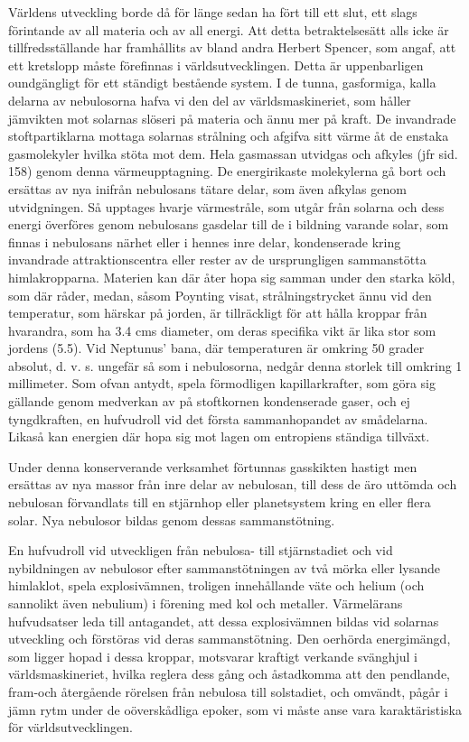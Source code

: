 \documentclass[a4paper, 12pt, oneside, swedish]{article}
\begin{document}
Världens utveckling borde då för länge sedan ha fört till ett slut, ett slags förintande av all materia och av all energi. Att detta betraktelsesätt alls icke är tillfredsställande har framhållits av bland andra Herbert Spencer, som angaf, att ett kretslopp måste förefinnas i världsutvecklingen. Detta är uppenbarligen oundgängligt för ett ständigt bestående system. I de tunna, gasformiga, kalla delarna av nebulosorna hafva vi den del av världsmaskineriet, som håller jämvikten mot solarnas slöseri på materia och ännu mer på kraft. De invandrade stoftpartiklarna mottaga solarnas strålning och afgifva sitt värme åt de enstaka gasmolekyler hvilka stöta mot dem. Hela gasmassan utvidgas och afkyles (jfr sid. 158) genom denna värmeupptagning. De energirikaste molekylerna gå bort och ersättas av nya inifrån nebulosans tätare delar, som även afkylas genom utvidgningen. Så upptages hvarje värmestråle, som utgår från solarna och dess energi överföres genom nebulosans gasdelar till de i bildning varande solar, som finnas i nebulosans närhet eller i hennes inre delar, kondenserade kring invandrade attraktionscentra eller rester av de ursprungligen sammanstötta himlakropparna. Materien kan där åter hopa sig samman under den starka köld, som där råder, medan, såsom Poynting visat, strålningstrycket ännu vid den temperatur, som härskar på jorden, är tillräckligt för att hålla kroppar från hvarandra, som ha 3.4 cms diameter, om deras specifika vikt är lika stor som jordens (5.5). Vid Neptunus' bana, där temperaturen är omkring 50 grader absolut, d. v. s. ungefär så som i nebulosorna, nedgår denna storlek till omkring 1 millimeter. Som ofvan antydt, spela förmodligen kapillarkrafter, som göra sig gällande genom medverkan av på stoftkornen kondenserade gaser, och ej tyngdkraften, en hufvudroll vid det första sammanhopandet av smådelarna. Likaså kan energien där hopa sig mot lagen om entropiens ständiga tillväxt.

Under denna konserverande verksamhet förtunnas gasskikten hastigt men ersättas av nya massor från inre delar av nebulosan, till dess de äro uttömda och nebulosan förvandlats till en stjärnhop eller planetsystem kring en eller flera solar. Nya nebulosor bildas genom dessas sammanstötning.

En hufvudroll vid utveckligen från nebulosa- till stjärnstadiet och vid nybildningen av nebulosor efter sammanstötningen av två mörka eller lysande himlaklot, spela explosivämnen, troligen innehållande väte och helium (och sannolikt även nebulium) i förening med kol och metaller. Värmelärans hufvudsatser leda till antagandet, att dessa explosivämnen bildas vid solarnas utveckling och förstöras vid deras sammanstötning. Den oerhörda energimängd, som ligger hopad i dessa kroppar, motsvarar kraftigt verkande svänghjul i världsmaskineriet, hvilka reglera dess gång och åstadkomma att den pendlande, fram-och återgående rörelsen från nebulosa till solstadiet, och omvändt, pågår i jämn rytm under de oöverskådliga epoker, som vi måste anse vara karaktäristiska för världsutvecklingen.
\end{document}
